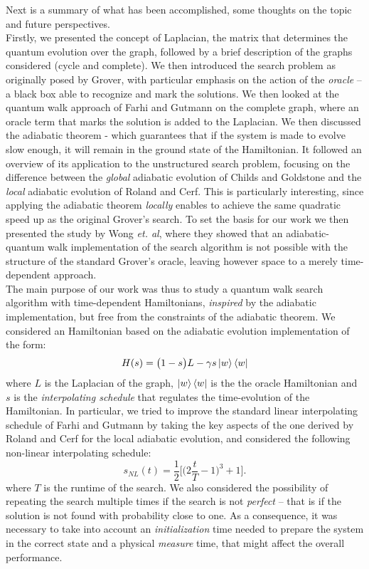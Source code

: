 \documentclass[11pt, twoside]{report}
\begin{document}
Next is a summary of what has been accomplished, some thoughts on the topic and future perspectives. \\ 

\noindent
Firstly, we presented the concept of Laplacian, the matrix that determines the quantum evolution over the graph, followed by a brief description of the graphs considered (cycle and complete). We then introduced the search problem as originally posed by Grover, with particular emphasis on the action of the \textit{oracle} -- a black box able to recognize and mark the solutions. We then looked at the quantum walk approach of Farhi and Gutmann on the complete graph, where an oracle term that marks the solution is added to the Laplacian. 
We then discussed the adiabatic theorem - which guarantees that if the system is made to evolve slow enough, it will remain in the ground state of the Hamiltonian. It followed an overview of its application to the unstructured search problem, focusing on the difference between the \textit{global} adiabatic evolution of Childs and Goldstone and the \textit{local} adiabatic evolution of Roland and Cerf. This is particularly interesting, since applying the adiabatic theorem \textit{locally} enables to achieve the same quadratic speed up as the original Grover's search.
To set the basis for our work we then presented the study by Wong \textit{et. al}, where they showed that an adiabatic-quantum walk implementation of the search algorithm is not possible with the structure of the standard Grover's oracle, leaving however space to a merely time-dependent approach. \\

The main purpose of our work was thus to study a quantum walk search algorithm with time-dependent Hamiltonians, \textit{inspired} by the adiabatic implementation, but free from the constraints of the adiabatic theorem. We considered an Hamiltonian based on the adiabatic evolution implementation of the form:
\begin{equation*}
H(s) = \big(1-s\big)L -\gamma s\ket{w}\bra{w}
\end{equation*} 
where $L$ is the Laplacian of the graph, $\ket{w}\bra{w}$ is the the oracle Hamiltonian and $s$ is the \textit{interpolating schedule} that regulates the time-evolution of the Hamiltonian. In particular, we tried to improve the standard linear interpolating schedule of Farhi and Gutmann by taking the key aspects of the one derived by Roland and Cerf for the local adiabatic evolution, and considered the following non-linear interpolating schedule:
\begin{equation*}
  s_{NL}(t)  = \frac{1}{2}\Big[\big(2\frac{t}{T} - 1\big)^3 +1\Big].
\end{equation*}
where $T$ is the runtime of the search. We also considered the possibility of repeating the search multiple times if the search is not \textit{perfect} -- that is if the solution is not found with probability close to one. As a consequence, it was necessary to take into account an \textit{initialization} time needed to prepare the system in the correct state and a physical \textit{measure} time, that might affect the overall performance. 
\end{document}
